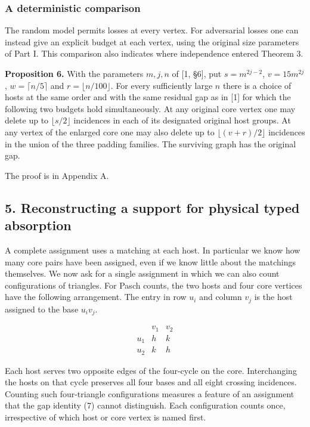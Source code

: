 \documentclass[english,11pt,a4paper]{article}
\begin{document}
\subsubsection{A deterministic comparison}\label{a-deterministic-comparison}

The random model permits losses at every vertex. For adversarial losses one can instead give an explicit budget at each vertex, using the original size parameters of Part I. This comparison also indicates where independence entered Theorem 3.

\textbf{Proposition 6.} With the parameters \(m,j,n\) of {[}1, §6{]}, put \(s=m^{2j-2}\), \(v=15m^{2j}\), \(w=\lceil n/5\rceil\) and \(r=\lfloor n/100\rfloor\). For every sufficiently large \(n\) there is a choice of hosts at the same order and with the same residual gap as in {[}1{]} for which the following two budgets hold simultaneously. At any original core vertex one may delete up to \(\lfloor s/2\rfloor\) incidences in each of its designated original host groups. At any vertex of the enlarged core one may also delete up to \(\lfloor(v+r)/2\rfloor\) incidences in the union of the three padding families. The surviving graph has the original gap.

The proof is in Appendix A.

\subsection{5. Reconstructing a support for physical typed absorption}\label{reconstructing-a-support-for-physical-typed-absorption}

A complete assignment uses a matching at each host. In particular we know how many core pairs have been assigned, even if we know little about the matchings themselves. We now ask for a single assignment in which we can also count configurations of triangles. For Pasch counts, the two hosts and four core vertices have the following arrangement. The entry in row \(u_i\) and column \(v_j\) is the host assigned to the base \(u_iv_j\).

\[\begin{array}{c|cc}
       &v_1&v_2\\ \hline
 u_1   &h&k\\
 u_2   &k&h
\end{array}\]

Each host serves two opposite edges of the four-cycle on the core. Interchanging the hosts on that cycle preserves all four bases and all eight crossing incidences. Counting such four-triangle configurations measures a feature of an assignment that the gap identity (7) cannot distinguish. Each configuration counts once, irrespective of which host or core vertex is named first.
\end{document}
